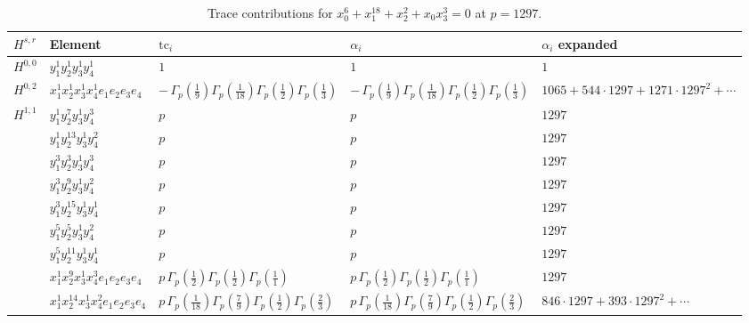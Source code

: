 \documentclass[11pt]{article}
\begin{document}
\begin{table}[ht]
\centering
\caption{Trace contributions for $x_0^{6} + x_1^{18} + x_2^{2} + x_0 x_3^{3} = 0$ at $p=1297$.}\label{tab:deformed-48}
\renewcommand{\arraystretch}{1.1}
{\scriptsize
\begin{tabular}{@{}lllll@{}}
\toprule
$H^{s,r}$ & Element & $\mathrm{tc}_i$ & $\alpha_i$ & $\alpha_i$ expanded \\
\midrule
$H^{0,0}$ & $y_{1}^{1} y_{2}^{1} y_{3}^{1} y_{4}^{1}$ & $1$ & $1$ & $1$ \\
\midrule
$H^{0,2}$ & $x_{1}^{1} x_{2}^{1} x_{3}^{1} x_{4}^{1}  e_{1} e_{2} e_{3} e_{4}$ & $- \, \Gamma_p \left( \frac{1}{9} \right) \Gamma_p \left( \frac{1}{18} \right) \Gamma_p \left( \frac{1}{2} \right) \Gamma_p \left( \frac{1}{3} \right)$ & $- \, \Gamma_p \left( \frac{1}{9} \right) \Gamma_p \left( \frac{1}{18} \right) \Gamma_p \left( \frac{1}{2} \right) \Gamma_p \left( \frac{1}{3} \right)$ & $1065{+}544{\cdot}1297{+}1271{\cdot}1297^{2}{+}\cdots$ \\
\midrule
$H^{1,1}$ & $y_{1}^{1} y_{2}^{7} y_{3}^{1} y_{4}^{3}$ & $p \,$ & $p \,$ & $1297$ \\
 & $y_{1}^{1} y_{2}^{13} y_{3}^{1} y_{4}^{2}$ & $p \,$ & $p \,$ & $1297$ \\
 & $y_{1}^{3} y_{2}^{3} y_{3}^{1} y_{4}^{3}$ & $p \,$ & $p \,$ & $1297$ \\
 & $y_{1}^{3} y_{2}^{9} y_{3}^{1} y_{4}^{2}$ & $p \,$ & $p \,$ & $1297$ \\
 & $y_{1}^{3} y_{2}^{15} y_{3}^{1} y_{4}^{1}$ & $p \,$ & $p \,$ & $1297$ \\
 & $y_{1}^{5} y_{2}^{5} y_{3}^{1} y_{4}^{2}$ & $p \,$ & $p \,$ & $1297$ \\
 & $y_{1}^{5} y_{2}^{11} y_{3}^{1} y_{4}^{1}$ & $p \,$ & $p \,$ & $1297$ \\
 & $x_{1}^{1} x_{2}^{9} x_{3}^{1} x_{4}^{3}  e_{1} e_{2} e_{3} e_{4}$ & $p \, \Gamma_p \left( \frac{1}{2} \right) \Gamma_p \left( \frac{1}{2} \right) \Gamma_p \left( \frac{1}{1} \right)$ & $p \, \Gamma_p \left( \frac{1}{2} \right) \Gamma_p \left( \frac{1}{2} \right) \Gamma_p \left( \frac{1}{1} \right)$ & $1297$ \\
 & $x_{1}^{1} x_{2}^{14} x_{3}^{1} x_{4}^{2}  e_{1} e_{2} e_{3} e_{4}$ & $p \, \Gamma_p \left( \frac{1}{18} \right) \Gamma_p \left( \frac{7}{9} \right) \Gamma_p \left( \frac{1}{2} \right) \Gamma_p \left( \frac{2}{3} \right)$ & $p \, \Gamma_p \left( \frac{1}{18} \right) \Gamma_p \left( \frac{7}{9} \right) \Gamma_p \left( \frac{1}{2} \right) \Gamma_p \left( \frac{2}{3} \right)$ & $846{\cdot}1297{+}393{\cdot}1297^{2}{+}\cdots$ \\

\end{tabular}}
\end{table}
\end{document}
